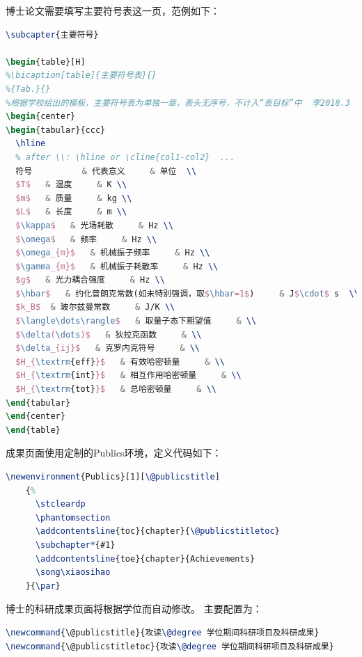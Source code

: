 博士论文需要填写主要符号表这一页，范例如下：
\begin{lstlisting}[language=TeX]
\subcapter{主要符号}

\begin{table}[H]
%\bicaption[table]{主要符号表}{}
%{Tab.}{}
%根据学校给出的模板，主要符号表为单独一章，表头无序号，不计入“表目标”中  李2018.3
\begin{center}
\begin{tabular}{ccc}
  \hline
  % after \\: \hline or \cline{col1-col2}  ...
  符号          & 代表意义     & 单位  \\
  $T$   & 温度     & K \\
  $m$   & 质量     & kg \\
  $L$   & 长度     & m \\
  $\kappa$   & 光场耗散     & Hz \\
  $\omega$   & 频率     & Hz \\
  $\omega_{m}$   & 机械振子频率     & Hz \\
  $\gamma_{m}$   & 机械振子耗散率     & Hz \\
  $g$   & 光力耦合强度     & Hz \\
  $\hbar$   & 约化普朗克常数(如未特别强调，取$\hbar=1$)     & J$\cdot$ s  \\
  $k_B$  & 玻尔兹曼常数     & J/K \\
  $\langle\dots\rangle$   & 取量子态下期望值     & \\
  $\delta(\dots)$   & 狄拉克函数     & \\ 
  $\delta_{ij}$   & 克罗内克符号     & \\ 
  $H_{\textrm{eff}}$   & 有效哈密顿量     & \\ 
  $H_{\textrm{int}}$   & 相互作用哈密顿量     & \\ 
  $H_{\textrm{tot}}$   & 总哈密顿量     & \\ 
\end{tabular}
\end{center}
\end{table}
\end{lstlisting}

成果页面使用定制的Publics环境，定义代码如下：
\begin{lstlisting}[language=TeX]
    \newenvironment{Publics}[1][\@publicstitle]
    {%
      \stcleardp
      \phantomsection
      \addcontentsline{toc}{chapter}{\@publicstitletoc}
      \subchapter*{#1}
      \addcontentsline{toe}{chapter}{Achievements}
      \song\xiaosihao
    }{\par}
\end{lstlisting}
博士的科研成果页面将根据学位而自动修改。
主要配置为：
\begin{lstlisting}[language=TeX]
\newcommand{\@publicstitle}{攻读\@degree 学位期间科研项目及科研成果}
\newcommand{\@publicstitletoc}{攻读\@degree 学位期间科研项目及科研成果}
\end{lstlisting}

